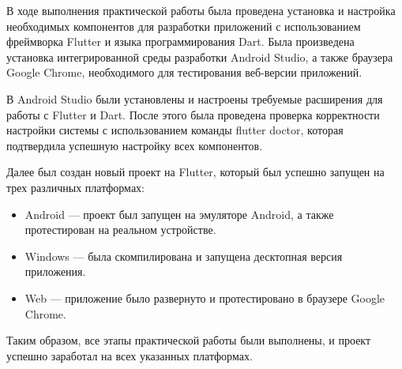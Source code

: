 В ходе выполнения практической работы была проведена установка
и настройка необходимых компонентов для разработки приложений
с использованием фреймворка Flutter и языка программирования Dart.
Была произведена установка интегрированной среды разработки Android Studio,
а также браузера Google Chrome,
необходимого для тестирования веб-версии приложений.\par
В Android Studio были установлены и настроены требуемые расширения
для работы с Flutter и Dart.
После этого была проведена проверка корректности настройки системы
с использованием команды flutter doctor,
которая подтвердила успешную настройку всех компонентов.\par
Далее был создан новый проект на Flutter,
который был успешно запущен на трех различных платформах:

\begin{itemize}
	\item Android --- проект был запущен на эмуляторе Android,
		а также протестирован на реальном устройстве.
	\item Windows --- была скомпилирована
		и запущена десктопная версия приложения.
	\item Web --- приложение было развернуто
		и протестировано в браузере Google Chrome.
\end{itemize}

Таким образом, все этапы практической работы были выполнены, и проект успешно заработал на всех указанных платформах.


